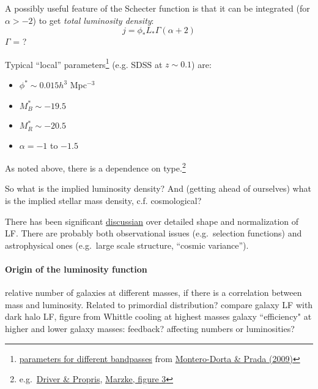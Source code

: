 \documentclass{article}
\newcommand{\mynotes}[1]{\textcolor{cadmiumgreen}{#1}}
\begin{document}
A possibly useful feature of the Schecter function is that it can be
integrated (for $\alpha > -2$) to get \textit{total luminosity density}:
\[
    j = \phi_{*}L_{*}\Gamma\left(\alpha + 2\right)
    \]
\mynotes{$\Gamma$ = ?}

Typical ``local'' parameters\footnote{
    \href{http://astronomy.nmsu.edu/holtz/a555/resources/monterotab2.gif}
    {parameters for different bandpasses} from
    \href{http://adsabs.harvard.edu/abs/2009MNRAS.399.1106M}
    {Montero-Dorta \& Prada (2009)}
}
(e.g. SDSS at $z\sim0.1$) are:
\begin{itemize}
    \item $\phi^{*}\sim0.015h^{3}$ Mpc$^{-3}$
    \item $M_{B}^{*}\sim-19.5$
    \item $M_{R}^{*}\sim-20.5$
    \item $\alpha=-1$ to $-1.5$
\end{itemize}
As noted above, there is a dependence on type.\footnote{
    e.g.\ \href{http://astronomy.nmsu.edu/holtz/a555/resources/lf_environment.gif}
    {Driver \& Propris},
    \href{http://astronomy.nmsu.edu/holtz/a555/html/diagrams/a616/marzke3.htm}
    {Marzke, figure 3}
}

So what is the implied luminosity density? And (getting ahead of ourselves)
what is the implied stellar mass density, c.f. cosmological?

There has been significant \href{http://astronomy.nmsu.edu/holtz/a555/images/blantontab3.htm}
{discussian} over detailed shape and normalization of
LF\@. There are probably both observational issues (e.g.\ selection functions)
and astrophysical ones (e.g.\ large scale structure, ``cosmic variance'').

\paragraph{Origin of the luminosity function}
relative number of galaxies at different masses, if there is a correlation
between mass and luminosity. Related to primordial distribution? compare galaxy
LF with dark halo LF, figure from Whittle cooling at highest masses galaxy
``efficiency" at higher and lower galaxy masses: feedback? affecting numbers or
luminosities?
\end{document}
